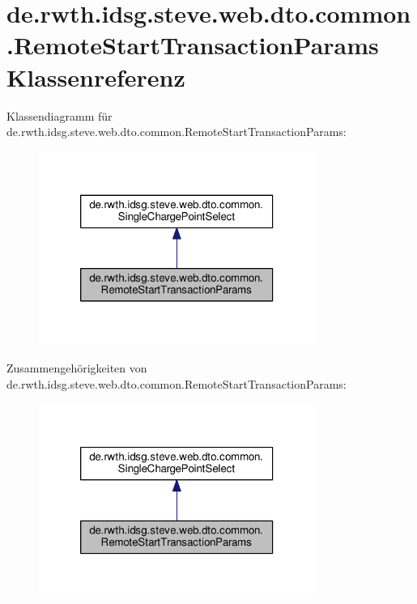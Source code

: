 \hypertarget{classde_1_1rwth_1_1idsg_1_1steve_1_1web_1_1dto_1_1common_1_1_remote_start_transaction_params}{\section{de.\-rwth.\-idsg.\-steve.\-web.\-dto.\-common.\-Remote\-Start\-Transaction\-Params Klassenreferenz}
\label{classde_1_1rwth_1_1idsg_1_1steve_1_1web_1_1dto_1_1common_1_1_remote_start_transaction_params}
}


Klassendiagramm für de.\-rwth.\-idsg.\-steve.\-web.\-dto.\-common.\-Remote\-Start\-Transaction\-Params\-:\nopagebreak
\begin{figure}[H]
\begin{center}
\leavevmode
\includegraphics[width=256pt]{classde_1_1rwth_1_1idsg_1_1steve_1_1web_1_1dto_1_1common_1_1_remote_start_transaction_params__inherit__graph}
\end{center}
\end{figure}


Zusammengehörigkeiten von de.\-rwth.\-idsg.\-steve.\-web.\-dto.\-common.\-Remote\-Start\-Transaction\-Params\-:\nopagebreak
\begin{figure}[H]
\begin{center}
\leavevmode
\includegraphics[width=256pt]{classde_1_1rwth_1_1idsg_1_1steve_1_1web_1_1dto_1_1common_1_1_remote_start_transaction_params__coll__graph}
\end{center}
\end{figure}
